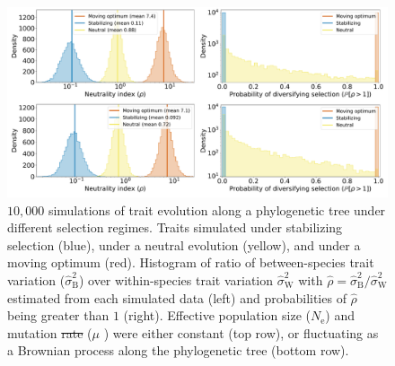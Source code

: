 \documentclass{article}
\newcommand{\Ne}{N_{\text{e}}}
\newcommand{\MutationRatePheno}{\mu}
\newcommand{\MutationRateNuc}{u} %
\newcommand{\EstRateBetween}{\widehat{\sigma}^2_{\mathrm{B}}} %
\newcommand{\EstRateWhithin}{\widehat{\sigma}^2_{\mathrm{W}}} %
\newcommand{\EstNI}{\widehat{\rho}}
\providecommand{\DIFaddtex}[1]{{\protect\color{blue}\uwave{#1}}} %
\providecommand{\DIFdeltex}[1]{{\protect\color{red}\sout{#1}}}                      %
\providecommand{\DIFaddFL}[1]{\DIFadd{#1}} %
\providecommand{\DIFdelFL}[1]{\DIFdel{#1}} %
\providecommand{\DIFaddbeginFL}{} %
\providecommand{\DIFaddendFL}{} %
\providecommand{\DIFdelbeginFL}{} %
\providecommand{\DIFdelendFL}{} %
\providecommand{\DIFadd}[1]{\texorpdfstring{\DIFaddtex{#1}}{#1}} %
\providecommand{\DIFdel}[1]{\texorpdfstring{\DIFdeltex{#1}}{}} %
\newcommand{\DIFscaledelfig}{0.5}
\newlength{\DIFdelgraphicswidth} %
\newlength{\DIFdelgraphicsheight} %
\newcommand{\DIFaddincludegraphics}[2][]{{\color{blue}\fbox{\DIFOincludegraphics[#1]{#2}}}} %
\newcommand{\DIFdelincludegraphics}[2][]{%
\sbox{\DIFdelgraphicsbox}{\DIFOincludegraphics[#1]{#2}}%
\settoboxwidth{\DIFdelgraphicswidth}{\DIFdelgraphicsbox} %
\settoboxtotalheight{\DIFdelgraphicsheight}{\DIFdelgraphicsbox} %
\scalebox{\DIFscaledelfig}{%
\parbox[b]{\DIFdelgraphicswidth}{\usebox{\DIFdelgraphicsbox}\\[-\baselineskip] \rule{\DIFdelgraphicswidth}{0em}}\llap{\resizebox{\DIFdelgraphicswidth}{\DIFdelgraphicsheight}{%
\setlength{\unitlength}{\DIFdelgraphicswidth}%
\begin{picture}(1,1)%
\thicklines\linethickness{2pt} %
{\color[rgb]{1,0,0}\put(0,0){\framebox(1,1){}}}%
{\color[rgb]{1,0,0}\put(0,0){\line( 1,1){1}}}%
{\color[rgb]{1,0,0}\put(0,1){\line(1,-1){1}}}%
\end{picture}%
}\hspace*{3pt}}} %
} %
\DeclareRobustCommand{\DIFaddbeginFL}{\DIFOaddbeginFL \let\includegraphics\DIFaddincludegraphics} %
\DeclareRobustCommand{\DIFaddendFL}{\DIFOaddendFL \let\includegraphics\DIFOincludegraphics} %
\DeclareRobustCommand{\DIFdelbeginFL}{\DIFOdelbeginFL \let\includegraphics\DIFdelincludegraphics} %
\DeclareRobustCommand{\DIFdelendFL}{\DIFOaddendFL \let\includegraphics\DIFOincludegraphics} %
\begin{document}
\begin{figure}[!ht]
    \centering
    \includegraphics[width=\textwidth, page=1] {figure3}
    \caption{
        $10,000$ simulations of trait evolution along a phylogenetic tree under different selection regimes.
        Traits simulated under stabilizing selection (blue), under a neutral evolution (yellow), and under a moving optimum (red).
        Histogram of ratio of between-species trait variation ($\EstRateBetween$) over within-species trait variation $\EstRateWhithin$ with $\EstNI = \EstRateBetween / \EstRateWhithin$ estimated from each simulated data (left) and probabilities of $\EstNI$ being greater than $1$ (right).
        Effective population size ($\Ne$) and mutation \DIFdelbeginFL \DIFdelFL{rate }\DIFdelendFL \DIFaddbeginFL \DIFaddFL{rates }\DIFaddendFL ($\MutationRatePheno$ \DIFaddbeginFL \DIFaddFL{and $\MutationRateNuc$}\DIFaddendFL ) were either constant (top row), or fluctuating as a Brownian process along the phylogenetic tree (bottom row).
    }
    \label{fig:results-simulations}
\end{figure}
\end{document}
